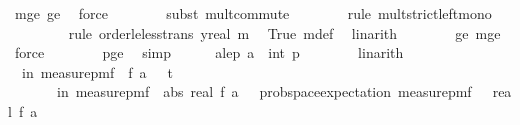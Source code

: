 \begin{isabellebody}
\ m{\isacharunderscore}{\kern0pt}ge{\isacharunderscore}{\kern0pt}{}\ {\isasymdelta}{\isacharprime}{\kern0pt}{\isacharunderscore}{\kern0pt}ge{\isacharunderscore}{\kern0pt}{}\ \isamarkupfalse%
\ force\isanewline
\ \ \ \ \ \ \isamarkupfalse%
\ {\isacharparenleft}{\kern0pt}subst\ mult{\isachardot}{\kern0pt}commute{\isacharparenright}{\kern0pt}\isanewline
\ \ \ \ \ \ \isamarkupfalse%
\ {\isacharparenleft}{\kern0pt}rule\ mult{\isacharunderscore}{\kern0pt}strict{\isacharunderscore}{\kern0pt}left{\isacharunderscore}{\kern0pt}mono{\isacharparenright}{\kern0pt}\isanewline
\ \ \ \ \ \ \ \isamarkupfalse%
\ {\isacharparenleft}{\kern0pt}rule\ order{\isacharunderscore}{\kern0pt}le{\isacharunderscore}{\kern0pt}less{\isacharunderscore}{\kern0pt}trans{\isacharbrackleft}{\kern0pt}\ y{\isacharequal}{\kern0pt}{\isachardoublequoteopen}real\ m{\isachardoublequoteclose}{\isacharbrackright}{\kern0pt}{\isacharparenright}{\kern0pt}\ \isamarkupfalse%
\ True\ m{\isacharunderscore}{\kern0pt}def\ \isamarkupfalse%
\ linarith\isanewline
\ \ \ \ \ \ \isamarkupfalse%
\ {\isasymdelta}{\isacharprime}{\kern0pt}{\isacharunderscore}{\kern0pt}ge{\isacharunderscore}{\kern0pt}{}\ m{\isacharunderscore}{\kern0pt}ge{\isacharunderscore}{\kern0pt}{}\ \isamarkupfalse%
\ force\isanewline
\ \ \ \ \ \ \isamarkupfalse%
\ p{\isacharunderscore}{\kern0pt}ge{\isacharunderscore}{\kern0pt}{}\ \isamarkupfalse%
\ simp\isanewline
\ \ \ \ \isamarkupfalse%
\ a{\isacharunderscore}{\kern0pt}le{\isacharunderscore}{\kern0pt}p{\isacharcolon}{\kern0pt}\ {\isachardoublequoteopen}a\ {\isacharless}{\kern0pt}\ int\ p{\isachardoublequoteclose}\isanewline
\ \ \ \ \ \ \isamarkupfalse%
\ linarith\isanewline
\isanewline
\ \ \ \ \isamarkupfalse%
\ {\isachardoublequoteopen}{\isasymP}{\isacharparenleft}{\kern0pt}{\isasymomega}\ in\ measure{\isacharunderscore}{\kern0pt}pmf\ {\isasymOmega}\ f\ a\ {\isasymomega}\ {\isasymge}\ t{\isacharparenright}{\kern0pt}\ {\isasymle}\ \isanewline
\ \ \ \ \ \ {\isasymP}{\isacharparenleft}{\kern0pt}{\isasymomega}\ in\ measure{\isacharunderscore}{\kern0pt}pmf\ {\isasymOmega}\ abs\ {\isacharparenleft}{\kern0pt}real\ {\isacharparenleft}{\kern0pt}f\ a\ {\isasymomega}{\isacharparenright}{\kern0pt}\ {\isacharminus}{\kern0pt}\ prob{\isacharunderscore}{\kern0pt}space{\isachardot}{\kern0pt}expectation\ {\isacharparenleft}{\kern0pt}measure{\isacharunderscore}{\kern0pt}pmf\ {\isasymOmega}\ {\isacharparenleft}{\kern0pt}{\isasymlambda}{\isasymomega}{\isachardot}{\kern0pt}\ real\ {\isacharparenleft}{\kern0pt}f\ a\ {\isasymomega}{\isacharparenright}{\kern0pt}{\isacharparenright}{\kern0pt}{\isacharparenright}{\kern0pt}\ \isanewline

\end{isabellebody}
